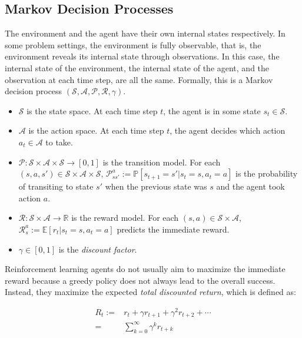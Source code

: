     \subsection{Markov Decision Processes}

        The environment and the agent have their own internal states respectively.
        In some problem settings, the environment is fully observable,
        that is, the environment reveals its internal state through observations.
        In this case, the internal state of the environment, the internal state of the agent,
        and the observation at each time step, are all the same.
        Formally, this is a Markov decision process $(\mathcal{S}, \mathcal{A}, \mathcal{P}, \mathcal{R}, \gamma)$.

        \begin{itemize}
            \item $\mathcal{S}$ is the state space.
                At each time step $t$, the agent is in some state $s_t \in \mathcal{S}$.
            \item $\mathcal{A}$ is the action space.
                At each time step $t$, the agent decides which action $a_t \in \mathcal{A}$ to take.
            \item $\mathcal{P}: \mathcal{S}\times\mathcal{A}\times\mathcal{S} \rightarrow [0,1]$
                is the transition model.
                For each $(s, a, s') \in \mathcal{S}\times\mathcal{A}\times\mathcal{S}$,
                $\mathcal{P}_{ss'}^a := \mathbb{P}[s_{t+1} = s' | s_t = s, a_t = a]$ is the probability of
                transiting to state $s'$ when the previous state was $s$ and the agent took action $a$.
            \item $\mathcal{R}: \mathcal{S} \times \mathcal{A} \rightarrow \mathbb{R}$ is the reward model.
                For each $(s, a) \in \mathcal{S} \times \mathcal{A}$,
                $\mathcal{R}_s^a := \mathbb{E}[r_{t} | s_t=s, a_t=a]$ predicts the immediate reward.
            \item $\gamma \in [0, 1]$ is the \emph{discount factor}.
        \end{itemize}
        
        Reinforcement learning agents do not usually aim to maximize the immediate reward
        because a greedy policy does not always lead to the overall success.
        Instead, they maximize the expected \emph{total discounted return}, which is defined as:

        \begin{align*}
            R_t :=& r_{t} + \gamma r_{t+1} + \gamma^2 r_{t+2} + \cdots \\
            =& \sum_{k=0}^{\infty} \gamma^k r_{t+k}
        \end{align*}

